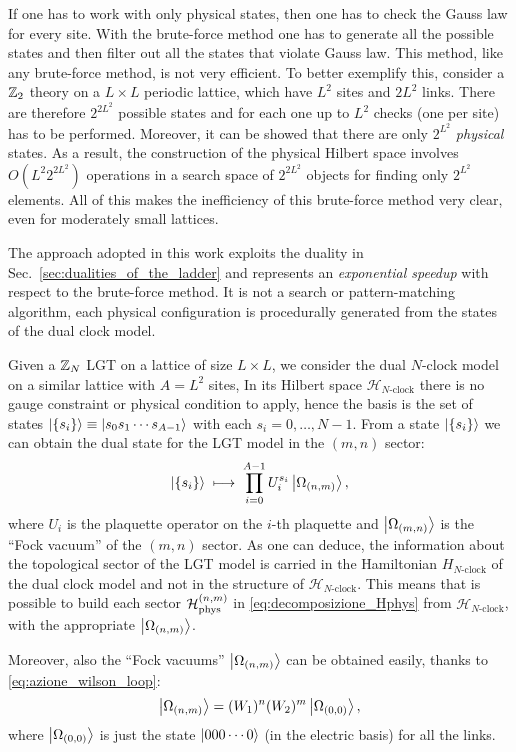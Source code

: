 If one has to work with only physical states, then one has to check the Gauss law for every site.
With the brute-force method one has to generate all the possible states and then filter out all the states that violate Gauss law.
This method, like any brute-force method, is not very efficient.
To better exemplify this, consider a $\mathbb{Z}_2$ theory on a $L \times L$ periodic lattice, which have $L^2$ sites and $2L^2$ links.
There are therefore $2^{2 L^2}$ possible states and for each one up to $L^2$ checks (one per site) has to be performed.
Moreover, it can be showed that there are only $2^{L^2}$ \emph{physical} states.
As a result, the construction of the physical Hilbert space involves $O(L^2 2^{2 L ^2})$ operations in a search space of $2^{2 L^2}$ objects for finding only $2^{L^2}$ elements.
All of this makes the inefficiency of this brute-force method very clear, even for moderately small lattices.


The approach adopted in this work exploits the duality in Sec.~\ref{sec:dualities_of_the_ladder} and represents an \emph{exponential speedup} with respect to the brute-force method.
It is not a search or pattern-matching algorithm, each physical configuration is procedurally generated from the states of the dual clock model.

Given a $\mathbb{Z}_N$ LGT on a lattice of size $L \times L$, we consider the dual $N$-clock model on a similar lattice with $A = L^2$ sites,
In its Hilbert space $\mathcal{H}_{N\text{-clock}}$ there is no gauge constraint or physical condition to apply,
hence the basis is the set of states $\ket{ \{s_i\} } \equiv \ket{s_0 s_1 \cdots s_{A-1}}$ with each $s_i = 0, \dots, N-1$.
From a state $\ket{ \{s_i\} }$ we can obtain the dual state for the LGT model in the $(m,n)$ sector:
\begin{equation}
    \ket{\{s_i\} } \; \longmapsto \;
    \prod_{i=0}^{A-1} U_i^{s_i} \ket{\Omega_{(n,m)}},
\end{equation}
where $U_i$ is the plaquette operator on the $i$-th plaquette and $\ket{\Omega_{(m,n)}}$ is the ``Fock vacuum'' of the $(m,n)$ sector.
As one can deduce, the information about the topological sector of the LGT model is carried in the Hamiltonian $H_{N\text{-clock}}$ of the dual clock model and not in the structure of $\mathcal{H}_{N \text{-clock}}$.
This means that is possible to build each sector $\mathcal{H}_{\text{phys}}^{(n,m)}$ in \eqref{eq:decomposizione_Hphys} from $\mathcal{H}_{N \text{-clock}}$, with the appropriate $\ket{\Omega_{(n,m)}}$.


Moreover, also the ``Fock vacuums'' $\ket{\Omega_{(n,m)}}$ can be obtained easily, thanks to \eqref{eq:azione_wilson_loop}:
\begin{equation}
    \ket{\Omega_{(n,m)}} = (W_1)^n (W_2)^m \ket{\Omega_{(0,0)}},
\end{equation}
where $\ket{\Omega_{(0,0)}}$ is just the state $\ket{000 \cdots 0}$ (in the electric basis) for all the links.


